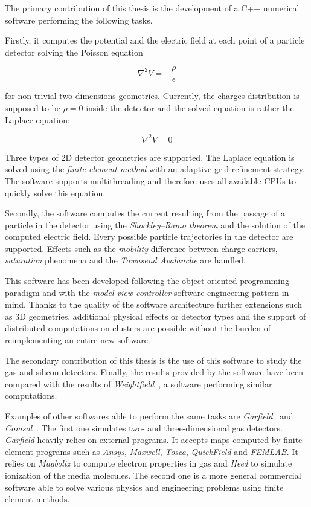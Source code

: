 \documentclass[11pt]{article}
\begin{document}
		The primary contribution of this thesis is the development of a C++ numerical software performing the
		following tasks.

		Firstly, it computes the potential and the electric field
		at each point of a particle detector solving the Poisson equation

		\[\nabla^2 V = -\frac{\rho}{\epsilon}\]

		for non-trivial	two-dimensions geometries. Currently, the charges distribution
		is supposed to be $\rho=0$ inside the detector and the solved equation is
		rather the Laplace equation:

		\[\nabla^2 V = 0\]

		Three types of 2D detector geometries are supported.
		The Laplace equation is solved using the \textit{finite element method} with an adaptive
		grid refinement strategy. The software supports multithreading and therefore
		uses all available CPUs to quickly solve this equation.

		Secondly, the software computes the current resulting from the passage of a particle
		in the detector using the \textit{Shockley–Ramo theorem} and the solution of the
		computed electric field. Every possible particle trajectories in the detector
		are supported. Effects such as the \textit{mobility} difference between
		charge carriers, \textit{saturation} phenomena and the
		\textit{Townsend Avalanche} are handled.

		This software has been developed following the object-oriented
		programming paradigm and with the \textit{model-view-controller}
		software engineering pattern in mind. Thanks to the quality of the software
		architecture further extensions such as 3D geometries, additional physical effects or
		detector types and the support of distributed computations on clusters are possible
		without the burden of reimplementing an entire new software.

		The secondary contribution of this thesis is the use of this software to study
		the gas and silicon detectors. Finally, the results provided by the
		software have been compared with the results of \textit{Weightfield}~\cite{Cenna2015}, a
		software performing similar computations.

		Examples of other softwares able to perform the same tasks are
		\textit{Garfield}~\cite{garfield}	and \textit{Comsol}~\cite{comsol}.
		The first one simulates two- and three-dimensional gas detectors.
		\textit{Garfield} heavily relies on external programs.
		It accepts maps computed by finite element programs such as \textit{Ansys},
		\textit{Maxwell}, \textit{Tosca}, \textit{QuickField} and \textit{FEMLAB}.
		It relies on \textit{Magboltz} to compute electron properties in gas and
		\textit{Heed} to simulate ionization of the media molecules.
		The second one is a more general commercial software able to solve various physics and
		engineering problems using finite element methods.
\end{document}
